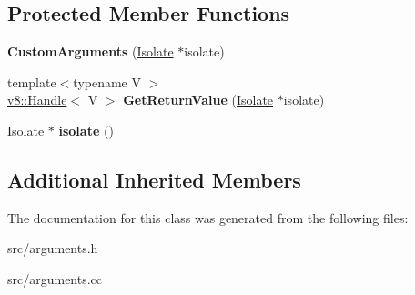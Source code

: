 \subsection*{Protected Member Functions}
\begin{DoxyCompactItemize}
\item 
\hypertarget{classv8_1_1internal_1_1_custom_arguments_a4269b099942f91e5ce1deaff371e1330}{}{\bfseries Custom\+Arguments} (\hyperlink{classv8_1_1internal_1_1_isolate}{Isolate} $\ast$isolate)\label{classv8_1_1internal_1_1_custom_arguments_a4269b099942f91e5ce1deaff371e1330}

\item 
\hypertarget{classv8_1_1internal_1_1_custom_arguments_ab9152b2f904decfabc799d863fa74bac}{}{\footnotesize template$<$typename V $>$ }\\\hyperlink{classv8_1_1_handle}{v8\+::\+Handle}$<$ V $>$ {\bfseries Get\+Return\+Value} (\hyperlink{classv8_1_1internal_1_1_isolate}{Isolate} $\ast$isolate)\label{classv8_1_1internal_1_1_custom_arguments_ab9152b2f904decfabc799d863fa74bac}

\item 
\hypertarget{classv8_1_1internal_1_1_custom_arguments_a144347b17b87f729468c79c88a0b7686}{}\hyperlink{classv8_1_1internal_1_1_isolate}{Isolate} $\ast$ {\bfseries isolate} ()\label{classv8_1_1internal_1_1_custom_arguments_a144347b17b87f729468c79c88a0b7686}

\end{DoxyCompactItemize}
\subsection*{Additional Inherited Members}


The documentation for this class was generated from the following files\+:\begin{DoxyCompactItemize}
\item 
src/arguments.\+h\item 
src/arguments.\+cc\end{DoxyCompactItemize}
